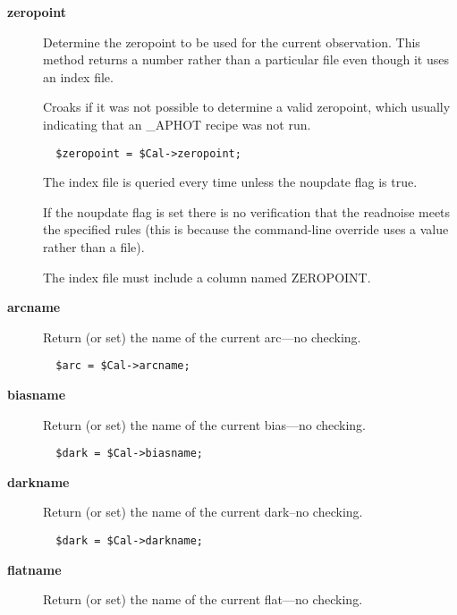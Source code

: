 \begin{description}
\item[{\textbf{zeropoint}}] \mbox{}

Determine the zeropoint to be used for the current observation.
This method returns a number rather than a particular file even
though it uses an index file.



Croaks if it was not possible to determine a valid zeropoint, which
usually indicating that an \_APHOT recipe was not run.

\begin{verbatim}
  $zeropoint = $Cal->zeropoint;
\end{verbatim}


The index file is queried every time unless the noupdate flag is true.



If the noupdate flag is set there is no verification that the
readnoise meets the specified rules (this is because the command-line
override uses a value rather than a file).



The index file must include a column named ZEROPOINT.


\item[{\textbf{arcname}}] \mbox{}

Return (or set) the name of the current arc---no checking.

\begin{verbatim}
  $arc = $Cal->arcname;
\end{verbatim}

\item[{\textbf{biasname}}] \mbox{}

Return (or set) the name of the current bias---no checking.

\begin{verbatim}
  $dark = $Cal->biasname;
\end{verbatim}

\item[{\textbf{darkname}}] \mbox{}

Return (or set) the name of the current dark--no checking.

\begin{verbatim}
  $dark = $Cal->darkname;
\end{verbatim}

\item[{\textbf{flatname}}] \mbox{}

Return (or set) the name of the current flat---no checking.


\end{description}
